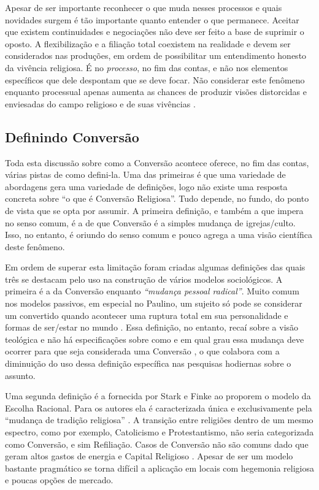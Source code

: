 \documentclass[
	12pt,				%
	oneside,			%
	a4paper,			%
	sumario=tradicional,
	english,			%
	brazil				%
	]{abntex2}
\begin{document}
Apesar de ser importante reconhecer o que muda nesses processos e quais novidades surgem é tão importante quanto entender o que permanece. Aceitar que existem continuidades e negociações não deve ser feito a base de suprimir o oposto. A flexibilização e a filiação total coexistem na realidade e devem ser considerados nas produções, em ordem de possibilitar um entendimento honesto da vivência religiosa. É no \emph{processo}, no fim das contas, e não nos elementos específicos que dele despontam que se deve focar. Não considerar este fenômeno enquanto processual apenas aumenta as chances de produzir visões distorcidas e enviesadas do campo religioso e de suas vivências \autocite{engelke_discontinuity_2004,teixeira_processos_2021,reesink_conversao_2014}.

\hypertarget{definindo-conversuxe3o}{%
\subsection{Definindo Conversão}\label{definindo-conversuxe3o}}

Toda esta discussão sobre como a Conversão acontece oferece, no fim das contas, várias pistas de como defini-la. Uma das primeiras é que uma variedade de abordagens gera uma variedade de definições, logo não existe uma resposta concreta sobre ``o que é Conversão Religiosa''. Tudo depende, no fundo, do ponto de vista que se opta por assumir. A primeira definição, e também a que impera no senso comum, é a de que Conversão é a simples mudança de igrejas/culto. Isso, no entanto, é oriundo do senso comum e pouco agrega a uma visão científica deste fenômeno.

Em ordem de superar esta limitação foram criadas algumas definições das quais três se destacam pelo uso na construção de vários modelos sociológicos. A primeira é a da Conversão enquanto \emph{``mudança pessoal radical''}. Muito comum nos modelos passivos, em especial no Paulino, um sujeito só pode se considerar um convertido quando acontecer uma ruptura total em sua personalidade e formas de ser/estar no mundo \autocites[169]{snow_sociology_1984}[224]{snook_issues_2019}. Essa definição, no entanto, recaí sobre a visão teológica e não há especificações sobre como e em qual grau essa mudança deve ocorrer para que seja considerada uma Conversão \autocite[169]{snow_sociology_1984}, o que colabora com a diminuição do uso dessa definição específica nas pesquisas hodiernas sobre o assunto.

Uma segunda definição é a fornecida por Stark e Finke \autocite*{stark_acts_2000-1} ao proporem o modelo da Escolha Racional. Para os autores ela é caracterizada única e exclusivamente pela ``mudança de tradição religiosa'' \autocite[114]{stark_acts_2000-1}. A transição entre religiões dentro de um mesmo espectro, como por exemplo, Catolicismo e Protestantismo, não seria categorizada como Conversão, e sim Refiliação. Casos de Conversão não são comuns dado que geram altos gastos de energia e Capital Religioso \autocite[119]{stark_acts_2000-1}. Apesar de ser um modelo bastante pragmático se torna difícil a aplicação em locais com hegemonia religiosa e poucas opções de mercado.
\end{document}
